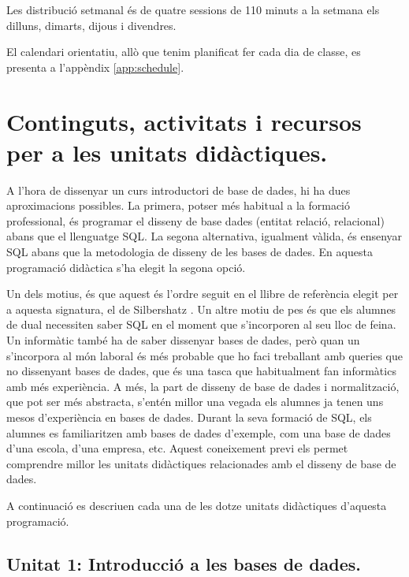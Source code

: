 \documentclass[catalan, a4paper, 12pt, titlepage]{article}
\begin{document}
Les distribució setmanal és de quatre sessions de 110 minuts a la setmana els dilluns, dimarts, dijous i divendres.

El calendari orientatiu, allò que tenim planificat fer cada dia de classe, es presenta a l'appèndix \ref{app:schedule}.

\section{Continguts, activitats i recursos per a les unitats didàctiques.}
\label{sec:unitats}

A l'hora de dissenyar un curs introductori de base de dades, hi ha dues aproximacions possibles.
La primera, potser més habitual a la formació professional, és programar el disseny de base dades (entitat relació, relacional) abans que el llenguatge SQL.
La segona alternativa, igualment vàlida, és ensenyar SQL abans que la metodologia de disseny de les bases de dades.
En aquesta programació didàctica s'ha elegit la segona opció.

Un dels motius, és que aquest és l'ordre seguit en el llibre de referència elegit per a aquesta signatura, el de Silbershatz \cite{silbershatz2020}.
Un altre motiu de pes és que els alumnes de dual necessiten saber SQL en el moment que s'incorporen al seu lloc de feina.
Un informàtic també ha de saber dissenyar bases de dades, però quan un s'incorpora al món laboral és més probable que ho faci treballant amb queries que no dissenyant bases de dades, que és una tasca que habitualment fan informàtics amb més experiència.
A més, la part de disseny de base de dades i normalització, que pot ser més abstracta, s'entén millor una vegada els alumnes ja tenen uns mesos d'experiència en bases de dades.
Durant la seva formació de SQL, els alumnes es familiaritzen amb bases de dades d'exemple, com una base de dades d'una escola, d'una empresa, etc.
Aquest coneixement previ els permet comprendre millor les unitats didàctiques relacionades amb el disseny de base de dades.

A continuació es descriuen cada una de les dotze unitats didàctiques d'aquesta programació.

  \subsection{Unitat 1: Introducció a les bases de dades.}
\end{document}
